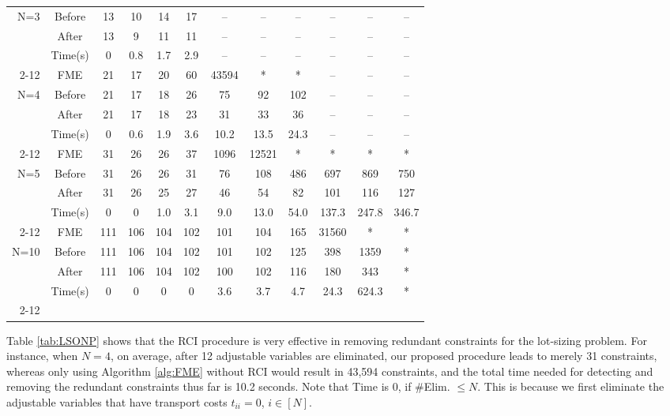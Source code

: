 \documentclass[fleqn,isre,blindrev]{informs4}
\begin{document}
\begin{example}
\begin{table*}[t]
\begin{tabular}{rc|cccccccccc}
\multirow{2}{*}{N=3}	   & Before & 13    & 10    & 14    & 17   & --     & --      &  --      &  --      &  --      &  --  \\
& After & 13    & 9     & 11    & 11   & --     & --      &  --      &  --      &  --      &  --  \\
& Time(s)  & 0   & 0.8   & 1.7   & 2.9  & --     & --      &  --      &  --      &  --      &  --  \\ \cline{2-12}
& FME   & 21    & 17    & 20    & 60    & 43594 & *   & *  & --      &  --      &  --  \\ 
\multirow{2}{*}{N=4} & Before & 21    & 17    & 18    & 26    & 75    & 92    & 102   & --      &  --      &  -- \\ 
					& After & 21    & 17    & 18    & 23    & 31    & 33    & 36    & --      &  --      &  --  \\
					&  Time(s) & 0     & 0.6    & 1.9   &   3.6   & 10.2   & 13.5  & 24.3  & --     & --     & -- \\ \cline{2-12}
					& FME   & 31    & 26    & 26    & 37    & 1096  & 12521 & *   & *   & *   & * \\ 
					\multirow{2}{*}{N=5} & Before & 31    & 26    & 26    & 31    & 76    &    108   & 486   & 697   & 869   & 750 \\ 
					& After & 31    & 26    & 25    & 27    & 46    &    54   & 82    & 101   & 116   & 127 \\
					& Time(s) & 0     & 0     & 1.0   & 3.1     & 9.0   & 13.0  & 54.0  & 137.3 & 247.8 & 346.7 \\	\cline{2-12}
					& FME   & 111   & 106   & 104   & 102   & 101   & 104   & 165   & 31560 & *   & * \\  
					\multirow{2}{*}{N=10}  & Before & 111   & 106   & 104   & 102   & 101   & 102   & 125   & 398   & 1359  & * \\
					& After & 111   & 106   & 104   & 102   & 100   & 102   & 116   & 180   & 343   & * \\
					&  Time(s)  & 0     & 0  & 0  & 0  & 3.6   & 3.7   & 4.7   & 24.3  & 624.3 & * \\ 	 \cline{2-12}
				\end{tabular}%
				\label{tab:LSONP}
			\end{table*}%
			Table \ref{tab:LSONP} shows that the RCI procedure is very effective in removing redundant constraints for the lot-sizing problem. For instance, when $N=4$, on average, after 12 adjustable variables are eliminated, our proposed procedure leads to merely 31 constraints, whereas only using Algorithm \ref{alg:FME} without RCI would result in 43,594 constraints, and the total time needed for detecting and removing the redundant constraints thus far is 10.2 seconds. Note that Time is 0, if \#Elim. $\le N$. This is because we first eliminate the adjustable variables that have transport costs $t_{ii}=0$, $i\in [N]$.
			 
			 \hfill \Halmos 
		\end{example}
		
\end{document}
